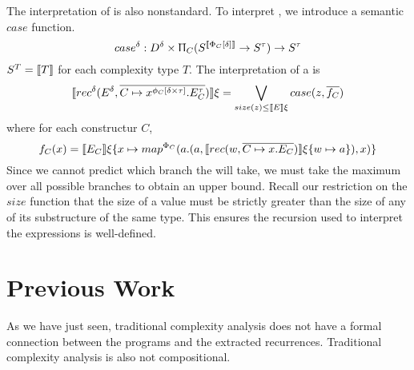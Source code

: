 The interpretation of  is also nonstandard. To interpret , we
introduce a semantic $case$ function.
%
\[
  case^\delta : D^\delta \times \Uppi_{C} (S^{\llbracket \Phi_C[\delta]\rrbracket} \to S^\tau) \to S^\tau
\]
%
$S^T = \llbracket T \rrbracket$ for each complexity type $T$. The interpretation of a  is
%
\[
  \llbracket rec^\delta(E^\delta, \overline{C \mapsto x^{\phi_C[\delta \times \tau]}.E_C^\tau}) \rrbracket \xi = \bigvee\limits_{size(z) \leq \llbracket E \rrbracket \xi} case(z, \overline{f_C})
\]
%
where for each constructur $C$,
%
\[
  f_C(x) = \llbracket E_C \rrbracket \xi \{ x \mapsto map^{\Phi_C}(a.(a, \llbracket rec(w, \overline{C \mapsto x.E_C})\rrbracket \xi \{ w \mapsto a \}), x) \}
\]
%
Since we cannot predict which branch the  will take, we must take the
maximum over all possible branches to obtain an upper bound. Recall our
restriction on the $size$ function that the size of a value must be strictly
greater than the size of any of its substructure of the same type. This ensures
the recursion used to interpret the  expressions is well-defined.


\section{Previous Work}

As we have just seen, traditional complexity analysis does not have a formal
connection between the programs and the extracted recurrences. Traditional
complexity analysis is also not compositional.




